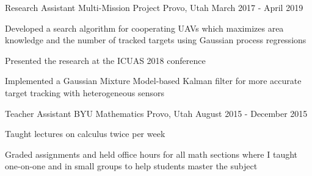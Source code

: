 \begin{cventries}
  \cventry
    {Research Assistant}
    {Multi-Mission Project}
    {Provo, Utah}
    {March 2017 - April 2019}
    {
      \begin{cvitems}
       \item Developed a search algorithm for cooperating UAVs which maximizes area knowledge and the number of tracked targets using Gaussian process regressions 
        \item Presented the research at the ICUAS 2018 conference
        \item Implemented a Gaussian Mixture Model-based Kalman filter for more accurate target tracking with heterogeneous sensors 
      \end{cvitems}
    }

  \cventry
    {Teacher Assistant}
    {BYU Mathematics}
    {Provo, Utah}
    {August 2015 - December 2015}
    {
      \begin{cvitems}
        \item Taught lectures on calculus twice per week
        \item Graded assignments and held office hours for all math sections where I taught one-on-one and in small groups to help students master the subject
      \end{cvitems}
    }

\end{cventries}
